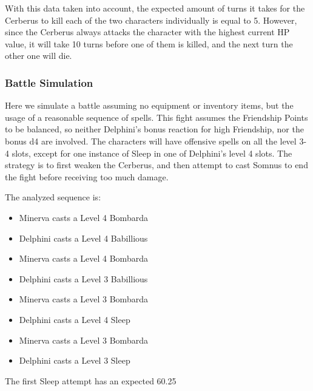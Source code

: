 With this data taken into account, the expected amount of turns it takes for the Cerberus to kill each of the two characters individually is equal to 5. However, since the Cerberus always attacks the character with the highest current HP value, it will take 10 turns before one of them is killed, and the next turn the other one will die.

\subsubsection{Battle Simulation}
Here we simulate a battle assuming no equipment or inventory items, but the usage of a reasonable sequence of spells. This fight assumes the Friendship Points to be balanced, so neither Delphini's bonus reaction for high Friendship, nor the bonus d4 are involved.
The characters will have offensive spells on all the level 3-4 slots, except for one instance of Sleep in one of Delphini's level 4 slots. The strategy is to first weaken the Cerberus, and then attempt to cast Somnus to end the fight before receiving too much damage.

The analyzed sequence is: \\
\begin{itemize}
	\item Minerva casts a Level 4 Bombarda
	\item Delphini casts a Level 4 Babillious
	\item Minerva casts a Level 4 Bombarda
	\item Delphini casts a Level 3 Babillious
	\item Minerva casts a Level 3 Bombarda
	\item Delphini casts a Level 4 Sleep
	\item Minerva casts a Level 3 Bombarda
	\item Delphini casts a Level 3 Sleep
\end{itemize}

The first Sleep attempt has an expected 60.25%

